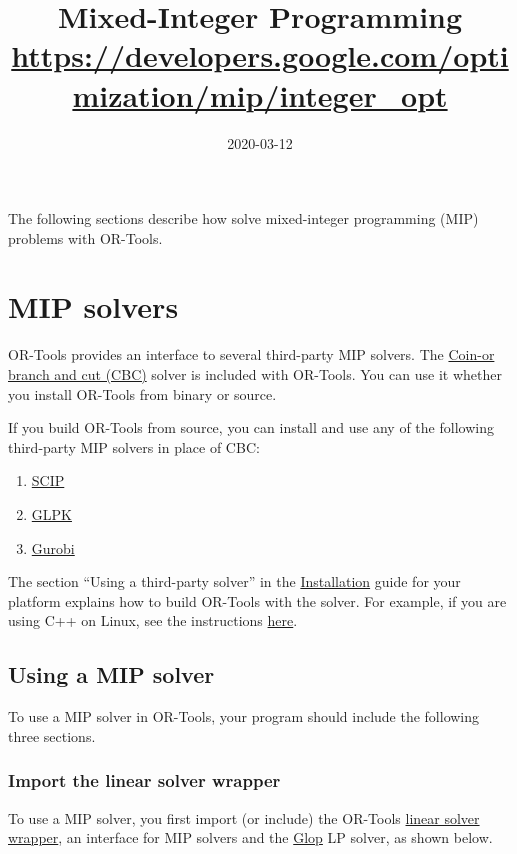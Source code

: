 \documentclass[a4paper,12pt,notitlepage,twoside,openright]{article}
\title{Mixed-Integer Programming\\{\footnotesize \url{https://developers.google.com/optimization/mip/integer_opt}}}
\author{}
\date{2020-03-12}
\begin{document}
\maketitle

The following sections describe how solve mixed-integer programming (MIP) problems with OR-Tools.

\section{MIP solvers}

OR-Tools provides an interface to several third-party MIP solvers. The \href{https://projects.coin-or.org/Cbc}{Coin-or branch and cut (CBC)} solver is included with OR-Tools. You can use it whether you install OR-Tools from binary or source.

If you build OR-Tools from source, you can install and use any of the following third-party MIP solvers in place of CBC:

\begin{enumerate}
\item \href{http://scip.zib.de/}{SCIP}
\item \href{https://www.gnu.org/software/glpk/}{GLPK}
\item \href{http://www.gurobi.com/}{Gurobi}
\end{enumerate}

The section ``Using a third-party solver'' in the \href{https://developers.google.com/optimization/install}{Installation} guide for your platform explains how to build OR-Tools with the solver. For example, if you are using C++ on Linux, see the instructions \href{https://developers.google.com/optimization/install/cpp/source_linux#third_party}{here}.

\subsection{Using a MIP solver}

To use a MIP solver in OR-Tools, your program should include the following three sections.

\subsubsection{Import the linear solver wrapper}

To use a MIP solver, you first import (or include) the OR-Tools \href{https://developers.google.com/optimization/reference/linear_solver/linear_solver}{linear solver wrapper}, an interface for MIP solvers and the \href{https://developers.google.com/optimization/lp/glop#overview_1}{Glop} LP solver, as shown below.
\end{document}
